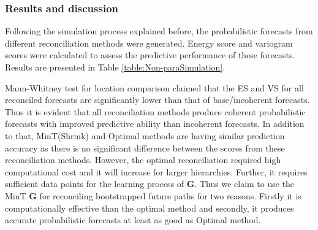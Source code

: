 \subsubsection{Results and discussion}
Following the simulation process explained before, the probabilistic forecasts from different reconciliation methods were generated. Energy score and variogram scores were calculated to assess the predictive performance of these forecasts. Results are presented in Table \ref{table:Non-paraSimulation}. 

Mann-Whitney test for location comparison claimed that the ES and VS for all reconciled forecasts are significantly lower than that of base/incoherent forecasts. Thus it is evident that all reconciliation methods produce coherent probabilistic forecasts with improved predictive ability than incoherent forecasts. In addition to that, MinT(Shrink) and Optimal methods are having similar prediction accuracy as there is no significant difference between the scores from these reconciliation methods. However, the optimal reconciliation required high computational cost and it will increase for larger hierarchies. Further, it requires sufficient data points for the learning process of $\bm{G}$. Thus we claim to use the MinT $\bm{G}$ for reconciling bootstrapped future paths for two reasons. Firstly it is computationally effective than the optimal method and secondly, it produces accurate probabilistic forecasts at least as good as Optimal method. 



